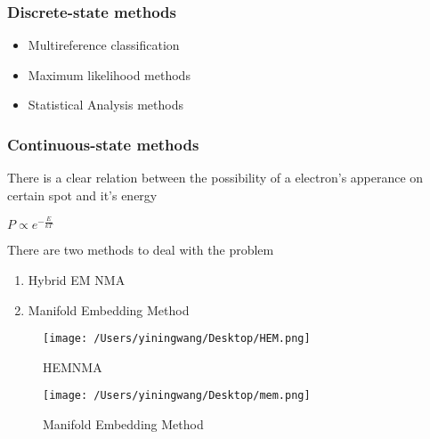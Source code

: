 \documentclass{article}
\begin{document}
    \subsubsection{Discrete-state methods}
    \begin{center}
        \begin{itemize}
           \item Multireference classification
           \item Maximum likelihood methods
           \item Statistical Analysis methods
       \end{itemize} 
    \end{center}
    \subsubsection{Continuous-state methods}
    There is a clear relation between the possibility of a electron's apperance on certain spot and it's energy
    \begin{center}
        \begin{framed}
            $P\propto e^{-\frac{E}{kT}}$
        \end{framed}
    \end{center} 
    There are two methods to deal with the problem
    \begin{center}
        \begin{enumerate}
           \item Hybrid EM NMA 
           \item Manifold Embedding Method
       \end{enumerate} 
    \begin{figure}[ht]
        \centering
        \texttt{[image: /Users/yiningwang/Desktop/HEM.png]} 
        \caption{\small HEMNMA}
    \end{figure}
    \end{center}
    \begin{figure}[ht]
        \centering
        \texttt{[image: /Users/yiningwang/Desktop/mem.png]} 
        \caption{\small Manifold Embedding Method}
    \end{figure}
   
    



    





    
\end{document}
